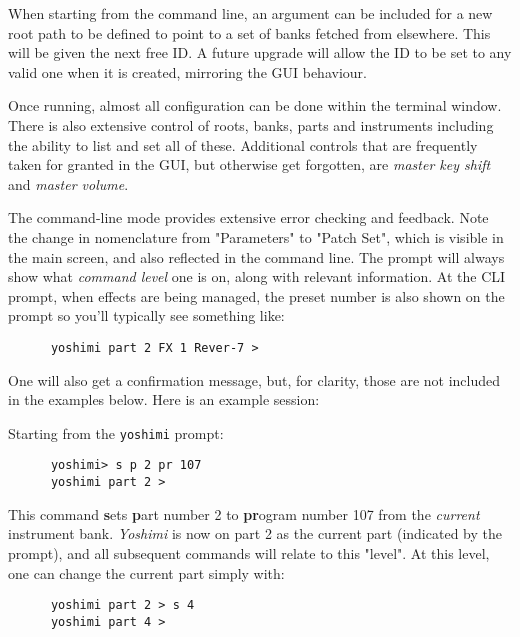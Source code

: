    When starting from the command line, an argument can be included for a new
   root path to be defined to point to a set of banks fetched from elsewhere.
   This will be given the next free ID. A future upgrade will allow the ID to
   be set to any valid one when it is created, mirroring the GUI behaviour.

   Once running, almost all configuration can be done within the terminal
   window.  There is also extensive control of roots, banks, parts and
   instruments including the ability to list and set all of these.
   Additional controls that are frequently taken for granted in the GUI, but
   otherwise get forgotten, are \textsl{master key shift} and \textsl{master
   volume}.


   The command-line mode provides extensive error checking and feedback.
   Note the change in nomenclature from "Parameters" to "Patch Set", which is
   visible in the main screen, and also reflected in the command line.
   The prompt will always show what \textsl{command level}
   one is on, along with relevant information.
   At the CLI prompt, when effects are being managed, the preset number is also
   shown on the prompt so you'll typically see something like:

   \begin{verbatim}
      yoshimi part 2 FX 1 Rever-7 >
   \end{verbatim}

   One will also get a confirmation message, but, for clarity,
   those are not included in the examples below.
   Here is an example session:

   Starting from the \texttt{yoshimi} prompt:

   \begin{verbatim}
      yoshimi> s p 2 pr 107
      yoshimi part 2 >
   \end{verbatim}

   This command \textbf{s}ets \textbf{p}art number 2 to \textbf{pr}ogram
   number 107 from the \textsl{current} instrument bank.
   \textsl{Yoshimi} is now on part 2 as the current part (indicated by the
   prompt), and all subsequent commands will relate to this "level".
   At this level, one can change the current part simply with:

   \begin{verbatim}
      yoshimi part 2 > s 4
      yoshimi part 4 >
   \end{verbatim}

